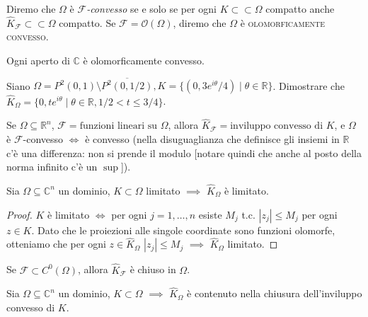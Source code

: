 Diremo che $\Omega$ è \textit{$\mathcal{F}$-convesso} se e solo se per ogni $K \subset \subset \Omega$ compatto anche $\hat{K}_{\mathcal{F}} \subset \subset \Omega$ compatto. Se $\mathcal{F}=\mathcal{O}(\Omega)$, diremo che $\Omega$ è \textsc{olomorficamente convesso}.

\begin{oss}
  Ogni aperto di $\mathbb{C}$ è olomorficamente convesso.
\end{oss}

\begin{exc}
  Siano $\Omega=P^2(0,1)\setminus\overline{P^2(0,1/2)}, K=\{(0,3e^{i\theta}/4) \mid \theta \in \mathbb{R}\}$. Dimostrare che $\hat{K}_\Omega=\{0, te^{i\theta} \mid \theta \in \mathbb{R}, 1/2 < t \le 3/4\}$.
\end{exc}

\begin{exc}
  Se $\Omega \subseteq \mathbb{R}^n$, $\mathcal{F}=\text{funzioni lineari su }\Omega$, allora $\hat{K}_{\mathcal{F}}=\text{inviluppo convesso di }K$, e $\Omega$ è $\mathcal{F}$-convesso $\iff$ è convesso (nella disuguaglianza che definisce gli insiemi in $\mathbb{R}$ c'è una differenza: non si prende il modulo [notare quindi che anche al posto della norma infinito c'è un $\sup$]).
\end{exc}

\begin{lm}
  Sia $\Omega \subseteq \mathbb{C}^n$ un dominio, $K \subset \Omega$ limitato $\implies$ $\hat{K}_{\Omega}$ è limitato.
\end{lm}

\begin{proof}
  $K$ è limitato $\iff$ per ogni $j=1,\dots,n$ esiste $M_j$ t.c. $|z_j| \le M_j$ per ogni $z \in K$. Dato che le proiezioni alle singole coordinate sono funzioni olomorfe, otteniamo che per ogni $z \in \hat{K}_\Omega$ $|z_j| \le M_j$ $\implies$ $\hat{K}_\Omega$ limitato.
\end{proof}

\begin{oss}
  Se $\mathcal{F} \subset C^0(\Omega)$, allora $\hat{K}_{\mathcal{F}}$ è chiuso in $\Omega$.
\end{oss}

\begin{lm}
  Sia $\Omega \subseteq \mathbb{C}^n$ un dominio, $K \subset \Omega$ $\implies$ $\hat{K}_\Omega$ è contenuto nella chiusura dell'inviluppo convesso di $K$.
\end{lm}

